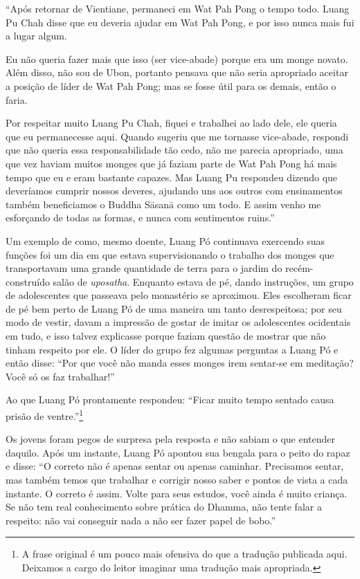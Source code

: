 ``Após retornar de Vientiane, permaneci em Wat Pah Pong o tempo todo.
Luang Pu Chah disse que eu deveria ajudar em Wat Pah Pong, e por isso
nunca mais fui a lugar algum.

Eu não queria fazer mais que isso (ser vice-abade) porque era um monge
novato. Além disso, não sou de Ubon, portanto pensava que não seria
apropriado aceitar a posição de líder de Wat Pah Pong; mas se fosse útil
para os demais, então o faria.

Por respeitar muito Luang Pu Chah, fiquei e trabalhei ao lado dele, ele
queria que eu permanecesse aqui. Quando sugeriu que me tornasse
vice-abade, respondi que não queria essa responsabilidade tão cedo, não
me parecia apropriado, uma que vez haviam muitos monges que já faziam
parte de Wat Pah Pong há mais tempo que eu e eram bastante capazes. Mas
Luang Pu respondeu dizendo que deveríamos cumprir nossos deveres,
ajudando uns aos outros com ensinamentos também beneficiamos o Buddha
Sāsanā como um todo. E assim venho me esforçando de todas as formas, e
nunca com sentimentos ruins.''

Um exemplo de como, mesmo doente, Luang Pó continuava exercendo suas
funções foi um dia em que estava supervisionando o trabalho dos monges
que transportavam uma grande quantidade de terra para o jardim do
recém-construído salão de \emph{uposatha}. Enquanto estava de pé, dando
instruções, um grupo de adolescentes que passeava pelo monastério se
aproximou. Eles escolheram ficar de pé bem perto de Luang Pó de uma
maneira um tanto desrespeitosa; por seu modo de vestir, davam a
impressão de gostar de imitar os adolescentes ocidentais em tudo, e isso
talvez explicasse porque faziam questão de mostrar que não tinham
respeito por ele. O líder do grupo fez algumas perguntas a Luang Pó e
então disse: ``Por que você não manda esses monges irem sentar-se em
meditação? Você só os faz trabalhar!''

Ao que Luang Pó prontamente respondeu: ``Ficar muito tempo sentado causa
prisão de ventre.''\footnote{A frase original é um pouco mais ofensiva
  do que a tradução publicada aqui. Deixamos a cargo do leitor imaginar
  uma tradução mais apropriada.}

Os jovens foram pegos de surpresa pela resposta e não sabiam o que
entender daquilo. Após um instante, Luang Pó apontou sua bengala para o
peito do rapaz e disse: ``O correto não é apenas sentar ou apenas
caminhar. Precisamos sentar, mas também temos que trabalhar e corrigir
nosso saber e pontos de vista a cada instante. O correto é assim. Volte
para seus estudos, você ainda é muito criança. Se não tem real
conhecimento sobre prática do Dhamma, não tente falar a respeito: não
vai conseguir nada a não ser fazer papel de bobo.''

